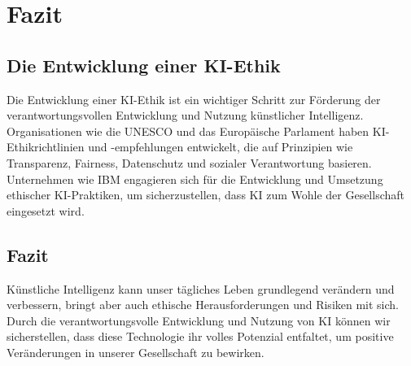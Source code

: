 \chapter{Fazit}
\section{Die Entwicklung einer KI-Ethik}
Die Entwicklung einer KI-Ethik ist ein wichtiger Schritt zur Förderung der verantwortungsvollen Entwicklung und Nutzung künstlicher Intelligenz. Organisationen wie die UNESCO und das Europäische Parlament haben KI-Ethikrichtlinien und -empfehlungen entwickelt, die auf Prinzipien wie Transparenz, Fairness, Datenschutz und sozialer Verantwortung basieren. Unternehmen wie IBM engagieren sich für die Entwicklung und Umsetzung ethischer KI-Praktiken, um sicherzustellen, dass KI zum Wohle der Gesellschaft eingesetzt wird.
\section{Fazit}
Künstliche Intelligenz kann unser tägliches Leben grundlegend verändern und verbessern, bringt aber auch ethische Herausforderungen und Risiken mit sich. Durch die verantwortungsvolle Entwicklung und Nutzung von KI können wir sicherstellen, dass diese Technologie ihr volles Potenzial entfaltet, um positive Veränderungen in unserer Gesellschaft zu bewirken.